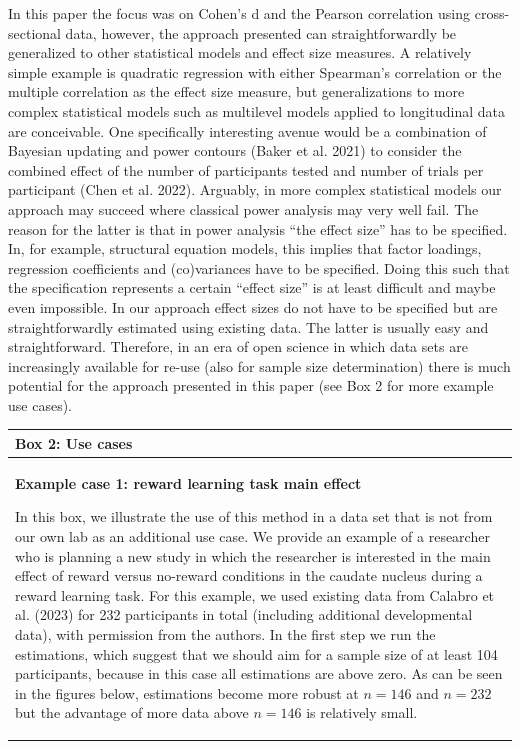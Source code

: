 \documentclass[
  letterpaper,
  DIV=11,
  numbers=noendperiod]{scrartcl}
\begin{document}
In this paper the focus was on Cohen's d and the Pearson correlation
using cross-sectional data, however, the approach presented can
straightforwardly be generalized to other statistical models and effect
size measures. A relatively simple example is quadratic regression with
either Spearman's correlation or the multiple correlation as the effect
size measure, but generalizations to more complex statistical models
such as multilevel models applied to longitudinal data are conceivable.
One specifically interesting avenue would be a combination of Bayesian
updating and power contours (Baker et al. 2021) to consider the combined
effect of the number of participants tested and number of trials per
participant (Chen et al. 2022). Arguably, in more complex statistical
models our approach may succeed where classical power analysis may very
well fail. The reason for the latter is that in power analysis ``the
effect size'' has to be specified. In, for example, structural equation
models, this implies that factor loadings, regression coefficients and
(co)variances have to be specified. Doing this such that the
specification represents a certain ``effect size'' is at least difficult
and maybe even impossible. In our approach effect sizes do not have to
be specified but are straightforwardly estimated using existing data.
The latter is usually easy and straightforward. Therefore, in an era of
open science in which data sets are increasingly available for re-use
(also for sample size determination) there is much potential for the
approach presented in this paper (see Box 2 for more example use cases).

\begin{longtable}[]{@{}
  >{\raggedright\arraybackslash}p{}@{}}
\toprule\noalign{}
\begin{minipage}[b]{\linewidth}\raggedright
Box 2: Use cases
\end{minipage} \\
\midrule\noalign{}
\endhead
\bottomrule\noalign{}
\endlastfoot
\textbf{Example case 1: reward learning task main effect}

In this box, we illustrate the use of this method in a data set that is
not from our own lab as an additional use case. We provide an example of
a researcher who is planning a new study in which the researcher is
interested in the main effect of reward versus no-reward conditions in
the caudate nucleus during a reward learning task. For this example, we
used existing data from Calabro et al. (2023) for 232 participants in
total (including additional developmental data), with permission from
the authors. In the first step we run the estimations, which suggest
that we should aim for a sample size of at least 104 participants,
because in this case all estimations are above zero. As can be seen in
the figures below, estimations become more robust at \(n=146\) and
\(n=232\) but the advantage of more data above \(n = 146\) is relatively
small. \\
\end{longtable}
\end{document}
